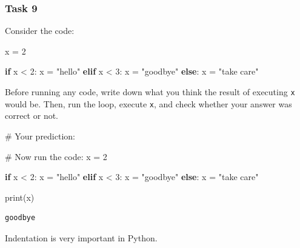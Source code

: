 \documentclass[
  11pt,
]{article}
\newenvironment{Shaded}{\begin{snugshade}}{\end{snugshade}}
\newcommand{\BuiltInTok}[1]{\textcolor[rgb]{0.00,0.23,0.31}{#1}}
\newcommand{\CommentTok}[1]{\textcolor[rgb]{0.37,0.37,0.37}{#1}}
\newcommand{\ControlFlowTok}[1]{\textcolor[rgb]{0.00,0.23,0.31}{\textbf{#1}}}
\newcommand{\DecValTok}[1]{\textcolor[rgb]{0.68,0.00,0.00}{#1}}
\newcommand{\NormalTok}[1]{\textcolor[rgb]{0.00,0.23,0.31}{#1}}
\newcommand{\OperatorTok}[1]{\textcolor[rgb]{0.37,0.37,0.37}{#1}}
\newcommand{\StringTok}[1]{\textcolor[rgb]{0.13,0.47,0.30}{#1}}
\begin{document}
\subsubsection{Task 9}\label{task-9}

Consider the code:

\begin{Shaded}
\begin{Highlighting}[]
\NormalTok{x }\OperatorTok{=} \DecValTok{2}

\ControlFlowTok{if}\NormalTok{ x }\OperatorTok{\textless{}} \DecValTok{2}\NormalTok{:}
\NormalTok{    x }\OperatorTok{=} \StringTok{"hello"}
\ControlFlowTok{elif}\NormalTok{ x }\OperatorTok{\textless{}} \DecValTok{3}\NormalTok{:}
\NormalTok{    x }\OperatorTok{=} \StringTok{"goodbye"}
\ControlFlowTok{else}\NormalTok{:}
\NormalTok{    x }\OperatorTok{=} \StringTok{"take care"}
\end{Highlighting}
\end{Shaded}

Before running any code, write down what you think the result of
executing \texttt{x} would be. Then, run the loop, execute \texttt{x},
and check whether your answer was correct or not.

\begin{Shaded}
\begin{Highlighting}[]
\CommentTok{\# Your prediction: }

\CommentTok{\# Now run the code:}
\NormalTok{x }\OperatorTok{=} \DecValTok{2}

\ControlFlowTok{if}\NormalTok{ x }\OperatorTok{\textless{}} \DecValTok{2}\NormalTok{:}
\NormalTok{    x }\OperatorTok{=} \StringTok{"hello"}
\ControlFlowTok{elif}\NormalTok{ x }\OperatorTok{\textless{}} \DecValTok{3}\NormalTok{:}
\NormalTok{    x }\OperatorTok{=} \StringTok{"goodbye"}
\ControlFlowTok{else}\NormalTok{:}
\NormalTok{    x }\OperatorTok{=} \StringTok{"take care"}

\BuiltInTok{print}\NormalTok{(x)}
\end{Highlighting}
\end{Shaded}

\begin{verbatim}
goodbye
\end{verbatim}

\begin{tcolorbox}[enhanced jigsaw, bottomrule=.15mm, colframe=quarto-callout-warning-color-frame, coltitle=black, left=2mm, title=\textcolor{quarto-callout-warning-color}{\faExclamationTriangle}\hspace{0.5em}{Caution}, opacityback=0, opacitybacktitle=0.6, leftrule=.75mm, breakable, bottomtitle=1mm, toprule=.15mm, rightrule=.15mm, arc=.35mm, titlerule=0mm, colback=white, toptitle=1mm, colbacktitle=quarto-callout-warning-color!10!white]

Indentation is very important in Python.

\end{tcolorbox}
\end{document}
